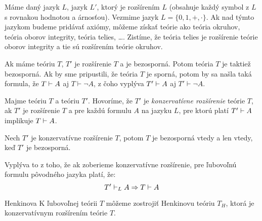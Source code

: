 \par Máme daný jazyk $L$, jazyk $L'$, ktorý je rozšírením $L$ (obsahuje každý
symbol z $L$ s rovnakou hodnotou a árnosťou). Vezmime jazyk $L= \{0, 1, +,
\cdot \}$. Ak nad týmto jazykom budeme pridávať axiómy, môžeme získať teórie ako
teória okruhov, teória oborov integrity, teória telies, \ldots . Zistíme, že
teória telies je rozšírenie teórie oborov integrity a tie sú rozšírením teórie
okruhov. 

\par Ak máme teóriu $T$, $T'$ je rozšírenie $T$ a je bezosporná. Potom teória
$T$ je taktiež bezosporná. Ak by sme pripustili, že teória $T$ je sporná, potom
by sa našla taká formula, že $T \vdash A$ aj $T \vdash \neg A$, z čoho vyplýva
$T' \vdash A$ aj $T' \vdash \neg A$.

\begin{definicia}
    Majme teóriu $T$ a teóriu $T'$. Hovoríme, že $T'$ je
    \emph{konzervatívne rozšírenie} teórie $T$,
    ak $T'$ je rozšírenie $T$ a pre každú formulu $A$ na jazyku $L$,
    pre ktorú platí $T' \vdash A$ implikuje $T \vdash A$.
\end{definicia}    

\begin{lema} 
    Nech $T'$ je konzervatívne rozšírenie $T$, potom $T$ je
    bezosporná vtedy a len vtedy, keď $T'$ je bezosporná.
\end{lema}
\begin{dokaz}
    Vyplýva to z toho, že ak zoberieme konzervatívne rozšírenie,
    pre ľubovoľnú formulu pôvodného jazyka platí, že:
    \begin{equation*}
        T' \vdash_L A \Rightarrow T \vdash A
    \end{equation*}
\end{dokaz}    

\begin{veta}{Henkinova} 
    K ľubovoľnej teórii $T$ môžeme zostrojiť Henkinovu
    teóriu $T_H$, ktorá je konzervatívnym rozšírením teórie $T$.
\end{veta}    

